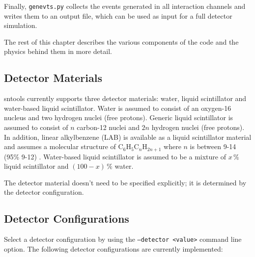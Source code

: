 \documentclass[11pt, oneside]{article}
\begin{document}
Finally, \texttt{genevts.py} collects the events generated in all interaction channels and writes them to an output file, which can be used as input for a full detector simulation.

The rest of this chapter describes the various components of the code and the physics behind them in more detail.


\subsection{Detector Materials}
sntools currently supports three detector materials: water, liquid scintillator and water-based liquid scintillator.
Water is assumed to consist of an oxygen-16 nucleus and two hydrogen nuclei (free protons).
Generic liquid scintillator is assumed to consist of $n$ carbon-12 nuclei and $2n$ hydrogen nuclei (free protons). In addition, linear alkylbenzene (LAB) is available as a liquid scintillator material and assumes a molecular structure of C$_6$H$_5$C$_n$H$_{2n+1}$ where $n$ is between 9-14 (95\% 9-12)  \cite{anderson2021development}.
Water-based liquid scintillator is assumed to be a mixture of $x\,\%$ liquid scintillator and $(100-x)\,\%$ water.

The detector material doesn’t need to be specified explicitly; it is determined by the detector configuration.


\subsection{Detector Configurations}\label{sec:detector-configurations}
Select a detector configuration by using the \texttt{--detector <value>} command line option. The following detector configurations are currently implemented:
\end{document}
